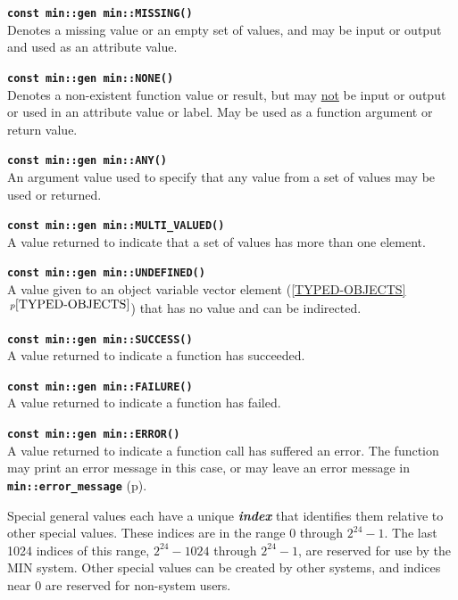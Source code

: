 \documentclass[12pt]{article}
\makeatletter
\newcommand{\TT}[1]{{\tt \bfseries #1}}
\newcommand{\ikey}[2]{{\bf \em #1}\index{#2}}
\newcommand{\ttindex}[1]{\index{#1@{\tt #1}}}
\newcommand{\itemref}[1]{\ref{#1}$\,^{p\pageref{#1}}$}
\newcommand{\pagref}[1]{p\pageref{#1}}
\newcommand{\EOL}{\penalty \exhyphenpenalty}
\newenvironment{indpar}[1][0.3in]%
	{\begin{list}{}%
		     {\setlength{\itemsep}{0in}%
		      \setlength{\topsep}{0in}%
		      \setlength{\parsep}{1ex}%
		      \setlength{\labelwidth}{#1}%
		      \setlength{\leftmargin}{#1}%
		      \addtolength{\leftmargin}{\labelsep}}%
	 \item}%
	{\end{list}}
\newcommand{\LABEL}[1]{\label{#1}}
\newcommand{\MINKEY}[1]%
	   {\TT{#1}\ttindex{min::#1}\ttindex{#1}}
\makeatother
\begin{document}
\begin{indpar}
\begin{list}{}{}
\item[\TT{const min::gen min::}\MINKEY{MISSING()}]~%
	\LABEL{MIN::MISSING}\\
Denotes a missing value or an empty set of values, and may be input
or output and used as an attribute value.
\item[\TT{const min::gen min::}\MINKEY{NONE()}]~%
	\LABEL{MIN::NONE}\\
Denotes a non-existent function value or result, but may \underline{not} be
input or output or used in an attribute value or label.  May be used
as a function argument or return value.
\item[\TT{const min::gen min::}\MINKEY{ANY()}]~%
	\LABEL{MIN::ANY}\\
An argument value used to specify that any value from a set of values may be
used or returned.
\item[\TT{const min::gen min::}\MINKEY{MULTI\_VALUED()}]~%
	\LABEL{MIN::MULTI_VALUED}\\
A value returned to indicate that
a set of values has more than one element.
\item[\TT{const min::gen min::}\MINKEY{UNDEFINED()}]~%
	\LABEL{MIN::UNDEFINED}\\
A value given to an object variable vector element
(\itemref{TYPED-OBJECTS}) that has no value and can be indirected.
\item[\TT{const min::gen min::}\MINKEY{SUCCESS()}]~%
	\LABEL{MIN::SUCCESS}\\
A value returned to indicate a function has succeeded.
\item[\TT{const min::gen min::}\MINKEY{FAILURE()}]~%
	\LABEL{MIN::FAILURE}\\
A value returned to indicate a function has failed.
\item[\TT{const min::gen min::}\MINKEY{ERROR()}]~%
	\LABEL{MIN::ERROR}\\
A value returned to indicate a function call has suffered an error.
The function may print an error message in
this case, or may leave an error message in
\TT{min::\EOL error\_\EOL message} (\pagref{ERROR_MESSAGE}).
\end{list}
\end{indpar}

Special general values each have a unique \ikey{index}{of special value}
that identifies them relative to other special values.  These
indices are in the range $0$ through $2^{24}-1$.  The last 1024 indices of this
range, $2^{24}-1024$ through $2^{24}-1$, are reserved for use by the MIN
system.  Other special values can be created by other systems,
and indices near 0 are reserved for non-system users.
\end{document}
